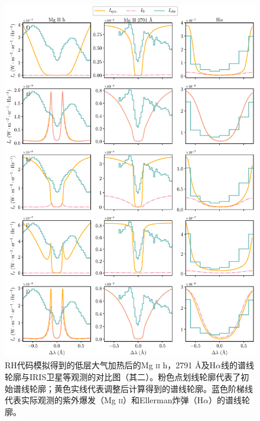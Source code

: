 \begin{figure}
	\centering
	\includegraphics[width=\textwidth]{figs/UVB_spec_2}
	\caption{RH代码模拟得到的低层大气加热后的Mg \textsc{ii} h，2791 \mbox{\AA}及H$\alpha$线的谱线轮廓与IRIS卫星等观测的对比图（其二）。粉色点划线轮廓代表了初始谱线轮廓；黄色实线代表调整后计算得到的谱线轮廓。蓝色阶梯线代表实际观测的紫外爆发（Mg \textsc{ii}）和Ellerman炸弹（H$\alpha$）的谱线轮廓。}
	\label{fig:5.3}
\end{figure}


